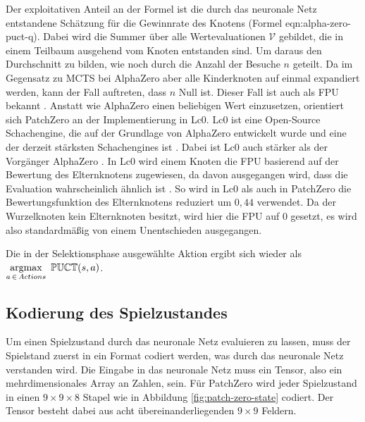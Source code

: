 Der exploitativen Anteil an der Formel ist die durch das neuronale Netz entstandene Schätzung für die Gewinnrate des Knotens (Formel eqn:alpha-zero-puct-q). Dabei wird die Summer über alle Wertevaluationen $\mathcal{V}$ gebildet, die in einem Teilbaum ausgehend vom Knoten entstanden sind. Um daraus den Durchschnitt zu bilden, wie noch durch die Anzahl der Besuche $n$ geteilt. Da im Gegensatz zu \ac{MCTS} bei AlphaZero aber alle Kinderknoten auf einmal expandiert werden, kann der Fall auftreten, dass $n$ Null ist. Dieser Fall ist auch als \ac{FPU} bekannt \cite[S. 4]{2006.FPU}. Anstatt wie AlphaZero einen beliebigen Wert einzusetzen, orientiert sich PatchZero an der Implementierung in \ac{Lc0}. \acl{Lc0} ist eine Open-Source Schachengine, die auf der Grundlage von AlphaZero entwickelt wurde und eine der derzeit stärksten Schachengines ist \cite{2024.Lc0}. Dabei ist \ac{Lc0} auch stärker als der Vorgänger AlphaZero \cite{2024.Lc0vsAlphaZero}. In \ac{Lc0} wird einem Knoten die \ac{FPU} basierend auf der Bewertung des Elternknotens zugewiesen, da davon ausgegangen wird, dass die Evaluation wahrscheinlich ähnlich ist \cite{2018.Lc0AlphaZero}. So wird in \ac{Lc0} als auch in PatchZero die Bewertungsfunktion des Elternknotens reduziert um $0{,}44$ verwendet. Da der Wurzelknoten kein Elternknoten besitzt, wird hier die \ac{FPU} auf 0 gesetzt, es wird also standardmäßig von einem Unentschieden ausgegangen.

Die in der Selektionsphase ausgewählte Aktion ergibt sich wieder als $\argmax\limits_{a\, \in\, Actions}\ \mathbb{PUCT}(s,a)$.

\pagebreak

\subsection{Kodierung des Spielzustandes}

Um einen Spielzustand durch das neuronale Netz evaluieren zu lassen, muss der Spielstand zuerst in ein Format codiert werden, was durch das neuronale Netz verstanden wird. Die Eingabe in das neuronale Netz muss ein Tensor, also ein mehrdimensionales Array an Zahlen, sein. Für PatchZero wird jeder Spielzustand in einen $9\times 9\times 8$ Stapel wie in Abbildung \ref{fig:patch-zero-state} codiert. Der Tensor besteht dabei aus acht übereinanderliegenden $9\times 9$ Feldern.

